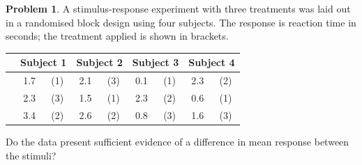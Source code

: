 \documentclass[11pt,a4paper]{article}
\theoremstyle{definition}
\newtheorem{problemx}{Problem}[section]
\newenvironment{problem}{\begin{problemx}}{\end{problemx}}
\begin{document}
\begin{problem}
A stimulus-response experiment with three treatments was laid out in a randomised block
design using four subjects. The response is reaction time in seconds; the treatment applied
is shown in brackets.
\begin{table}[H]
\centering
\begin{tabular}{|c|cc|cc|cc|cc|}
\hline
& \multicolumn{2}{c|}{Subject 1} & \multicolumn{2}{c|}{Subject 2} & \multicolumn{2}{c|}{Subject 3} & \multicolumn{2}{c|}{Subject 4}\\
\hline
& 1.7 & (1) & 2.1 & (3) & 0.1 & (1) & 2.3 & (2)\\
& 2.3 & (3) & 1.5 & (1) & 2.3 & (2) & 0.6 & (1)\\
& 3.4 & (2) & 2.6 & (2) & 0.8 & (3) & 1.6 & (3)\\
\hline
\end{tabular}
\end{table}
Do the data present sufficient evidence of a difference in mean response between the stimuli?
\end{problem}
\end{document}
